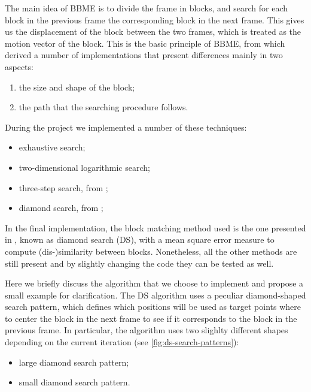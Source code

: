 The main idea of BBME is to divide the frame in blocks, and search for each block in the previous frame the corresponding block in the next frame.
This gives us the displacement of the block between the two frames, which is treated as the motion vector of the block.
This is the basic principle of BBME, from which derived a number of implementations that present differences mainly in two aspects:
\begin{enumerate}
    \item the size and shape of the block;
    \item the path that the searching procedure follows.
\end{enumerate}

During the project we implemented a number of these techniques:
\begin{itemize}
    \item exhaustive search;
    \item two-dimensional logarithmic search;
    \item {} three-step search, from \cite{Li94};
    \item diamond search, from \cite{Zhu2000};
\end{itemize}

In the final implementation, the block matching method used is the one presented in \cite{Zhu2000}, known as diamond search (DS),  with a mean square error measure to compute (dis-)similarity between blocks.
Nonetheless, all the other methods are still present and by slightly changing the code they can be tested as well.

Here we briefly discuss the algorithm that we choose to implement and propose a small example for clarification.
The DS algorithm uses a peculiar diamond-shaped search pattern, which defines which positions will be used as target points where to center the block in the next frame to see if it corresponds to the block in the previous frame. In particular, the algorithm uses two slighlty different shapes depending on the current iteration (see \cref*{fig:ds-search-patterns}):
\begin{itemize}
    \item large diamond search pattern;
    \item small diamond search pattern.
\end{itemize}

